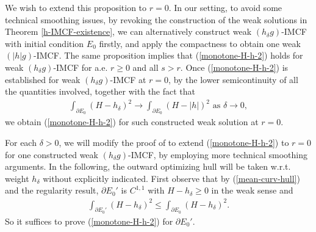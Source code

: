\documentclass[11pt, letterpaper]{amsart}
\theoremstyle{definition}
\theoremstyle{remark}
\begin{document}
We wish to extend this proposition to $r=0$. In our setting, to avoid some technical smoothing issues, by revoking the construction of the weak solutions in Theorem \ref{h-IMCF-existence}, we can alternatively construct weak $(h_{\delta }g)$-IMCF with initial condition $E_0$ firstly, and apply the compactness to obtain one weak $(|h|g)$-IMCF. The same proposition implies that (\ref{monotone-H-h-2}) holds for weak $(h_{\delta }g)$-IMCF for a.e. $r \geq 0$ and all $s>r$. Once (\ref{monotone-H-h-2}) is established for weak $(h_{\delta }g)$-IMCF at $r=0$, by the lower semicontinuity of all the quantities involved, together with the fact that
\begin{align*}
	\int_{\partial E_0} (H- h_{\delta })^2 \to \int_{\partial E_0} (H- |h|)^2 \text{ as } \delta \to 0,
\end{align*} 
we obtain (\ref{monotone-H-h-2}) for such constructed weak solution at $r=0$.


For each $\delta >0$, we will modify the proof of \cite[Proposition 5.7]{HI01} to extend (\ref{monotone-H-h-2}) to $r=0$ for one constructed weak $(h_{\delta }g)$-IMCF, by employing more technical smoothing arguments. In the following, the outward optimizing hull will be taken w.r.t. weight $h_{\delta }$ without explicitly indicated. First observe that by (\ref{mean-curv-hull}) and the regularity result, $\partial E_0'$ is $C^{1,1}$ with $H- h_{\delta } \geq 0$ in the weak sense and 
\begin{align*}
	\int_{\partial E_0'}(H- h_{\delta })^2 \leq \int_{\partial E_0} (H- h_{\delta })^2.
\end{align*} 
So it suffices to prove (\ref{monotone-H-h-2}) for $\partial E_0'$.


	
\end{document}
